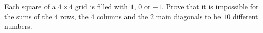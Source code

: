 Each square of a $4\times4$ grid is filled with $1$, $0$ or $-1$. Prove that it is impossible for the sums of the $4$ rows, the $4$ columns and the $2$ main diagonals to be $10$ different numbers.
